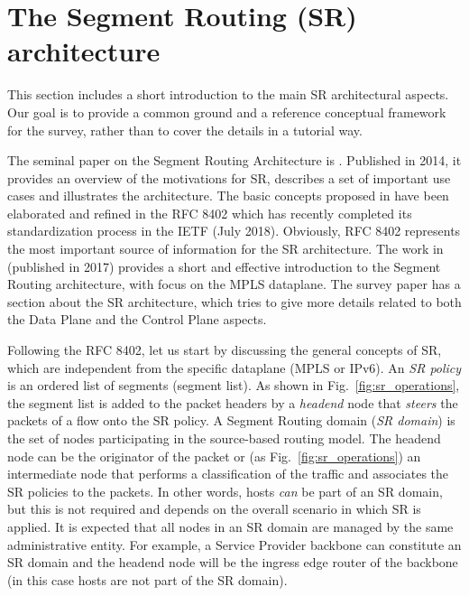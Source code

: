 \section{The Segment Routing (SR) architecture}
\label{sec:arch}

This section includes a short introduction to the main SR architectural aspects. Our goal is to provide a common ground and a reference conceptual framework for the survey, rather than to cover the details in a tutorial way.

The seminal paper on the Segment Routing Architecture is \cite{filsfils2015segment}. Published in 2014, it provides an overview of the motivations for SR, describes a set of important use cases and illustrates the architecture. The basic concepts proposed in \cite{filsfils2015segment} have been elaborated and refined in the RFC 8402 \cite{rfc8402} which has recently completed its standardization process in the IETF (July 2018). Obviously, RFC 8402 \cite{rfc8402} represents the most important source of information for the SR architecture. The work in \cite{sr-ietf-journal} (published in 2017) provides a short and effective introduction to the Segment Routing architecture, with focus on the MPLS dataplane. The survey paper \cite{abdullah2018segment} has a section about the SR architecture, which tries to give more details related to both the Data Plane and the Control Plane aspects.  

Following the RFC 8402, let us start by discussing the general concepts of SR, which are independent from the specific dataplane (MPLS or IPv6). An \textit{SR policy} is an ordered list of segments (segment list). As shown in Fig.~\ref{fig:sr_operations}, the segment list is added to the packet headers by a \textit{headend} node that \textit{steers} the packets of a flow onto the SR policy. A Segment Routing domain (\textit{SR domain}) is the set of nodes participating in the source-based routing model. The headend node can be the originator of the packet or (as Fig.~\ref{fig:sr_operations}) an intermediate node that performs a classification of the traffic and associates the SR policies to the packets. In other words, hosts \textit{can} be part of an SR domain, but this is not required and depends on the overall scenario in which SR is applied. It is expected that all nodes in an SR domain are managed by the same administrative entity. For example, a Service Provider backbone can constitute an SR domain and the headend node will be the ingress edge router of the backbone (in this case hosts are not part of the SR domain).

